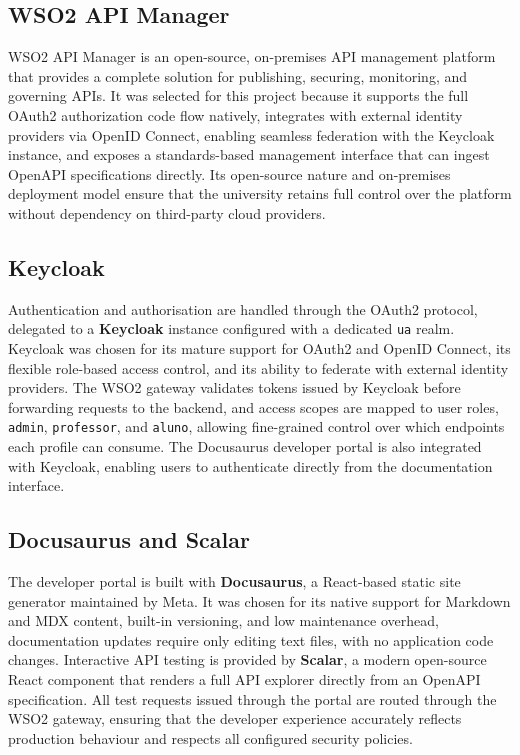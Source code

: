 \documentclass[12pt, a4paper]{report}
\begin{document}
\subsection{WSO2 API Manager}
WSO2 API Manager is an open-source, on-premises API management platform that provides
a complete solution for publishing, securing, monitoring, and governing APIs. It was
selected for this project because it supports the full OAuth2 authorization code flow
natively, integrates with external identity providers via OpenID Connect, enabling
seamless federation with the Keycloak instance, and exposes a standards-based
management interface that can ingest OpenAPI specifications directly. Its open-source
nature and on-premises deployment model ensure that the university retains full control
over the platform without dependency on third-party cloud providers.

\subsection{Keycloak}
Authentication and authorisation are handled through the OAuth2 protocol, delegated
to a \textbf{Keycloak} instance configured with a dedicated \texttt{ua} realm. Keycloak
was chosen for its mature support for OAuth2 and OpenID Connect, its flexible
role-based access control, and its ability to federate with external identity providers.
The WSO2 gateway validates tokens issued by Keycloak before forwarding requests to
the backend, and access scopes are mapped to user roles, \texttt{admin},
	\texttt{professor}, and \texttt{aluno}, allowing fine-grained control over which
endpoints each profile can consume. The Docusaurus developer portal is also integrated
with Keycloak, enabling users to authenticate directly from the documentation interface.

\subsection{Docusaurus and Scalar}
The developer portal is built with \textbf{Docusaurus}, a React-based static site
generator maintained by Meta. It was chosen for its native support for Markdown and
MDX content, built-in versioning, and low maintenance overhead, documentation
updates require only editing text files, with no application code changes. Interactive
API testing is provided by \textbf{Scalar}, a modern open-source React component
that renders a full API explorer directly from an OpenAPI specification. All test requests issued
through the portal are routed through the WSO2 gateway, ensuring that the developer
experience accurately reflects production behaviour and respects all configured security policies.
\end{document}
